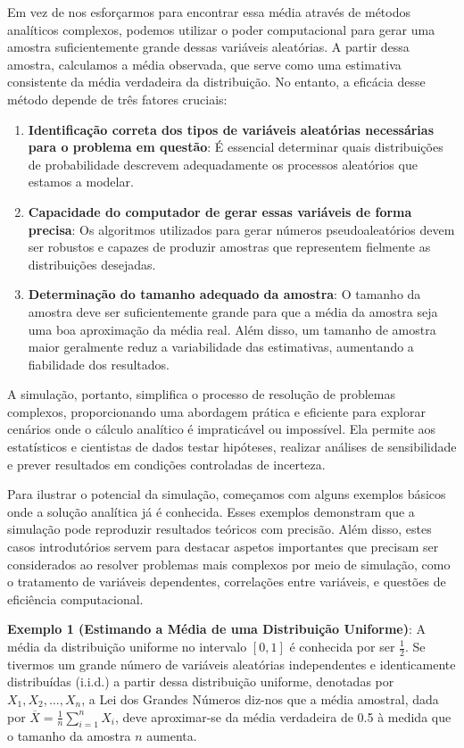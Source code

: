 \documentclass[
]{book}
\providecommand{\tightlist}{%
  \setlength{\itemsep}{0pt}\setlength{\parskip}{0pt}}
\begin{document}
Em vez de nos esforçarmos para encontrar essa média através de métodos
analíticos complexos, podemos utilizar o poder computacional para gerar
uma amostra suficientemente grande dessas variáveis aleatórias. A partir
dessa amostra, calculamos a média observada, que serve como uma
estimativa consistente da média verdadeira da distribuição. No entanto,
a eficácia desse método depende de três fatores cruciais:

\begin{enumerate}
\def\labelenumi{\arabic{enumi}.}
\tightlist
\item
  \textbf{Identificação correta dos tipos de variáveis aleatórias
  necessárias para o problema em questão}: É essencial determinar
  quais distribuições de probabilidade descrevem adequadamente os
  processos aleatórios que estamos a modelar.
\item
  \textbf{Capacidade do computador de gerar essas variáveis de forma
  precisa}: Os algoritmos utilizados para gerar números
  pseudoaleatórios devem ser robustos e capazes de produzir amostras
  que representem fielmente as distribuições desejadas.
\item
  \textbf{Determinação do tamanho adequado da amostra}: O tamanho da
  amostra deve ser suficientemente grande para que a média da amostra
  seja uma boa aproximação da média real. Além disso, um tamanho de
  amostra maior geralmente reduz a variabilidade das estimativas,
  aumentando a fiabilidade dos resultados.
\end{enumerate}

A simulação, portanto, simplifica o processo de resolução de problemas
complexos, proporcionando uma abordagem prática e eficiente para
explorar cenários onde o cálculo analítico é impraticável ou impossível.
Ela permite aos estatísticos e cientistas de dados testar hipóteses,
realizar análises de sensibilidade e prever resultados em condições
controladas de incerteza.

Para ilustrar o potencial da simulação, começamos com alguns exemplos
básicos onde a solução analítica já é conhecida. Esses exemplos
demonstram que a simulação pode reproduzir resultados teóricos com
precisão. Além disso, estes casos introdutórios servem para destacar
aspetos importantes que precisam ser considerados ao resolver problemas
mais complexos por meio de simulação, como o tratamento de variáveis
dependentes, correlações entre variáveis, e questões de eficiência
computacional.

\textbf{Exemplo 1 (Estimando a Média de uma Distribuição Uniforme)}: A média
da distribuição uniforme no intervalo \([0,1]\) é conhecida por ser
\(\frac{1}{2}\). Se tivermos um grande número de variáveis aleatórias
independentes e identicamente distribuídas (i.i.d.) a partir dessa
distribuição uniforme, denotadas por \(X_{1}, X_{2}, \ldots, X_{n}\), a
Lei dos Grandes Números diz-nos que a média amostral, dada por
\(\overline{X} = \frac{1}{n} \sum_{i=1}^{n} X_{i}\), deve aproximar-se da
média verdadeira de 0.5 à medida que o tamanho da amostra \(n\) aumenta.
\end{document}
